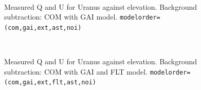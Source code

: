 \documentclass[twoside,11pt]{starlink}
\begin{document}
\begin{figure}[H]
\centering
{}
\hspace*{10pt}
\\
\caption{Measured Q and U for Uranus against elevation. Background
subtraction: COM with GAI model. \texttt{modelorder=(com,gai,ext,ast,noi)}}
\label{fig:urback2}
\end{figure}

\begin{figure}[H]
\centering
{}
\hspace*{10pt}
\\
\caption{Measured Q and U for Uranus against elevation. Background
subtraction: COM with GAI and FLT model.
\texttt{modelorder=(com,gai,ext,flt,ast,noi)}}
\label{fig:urback3}
\end{figure}
\end{document}
